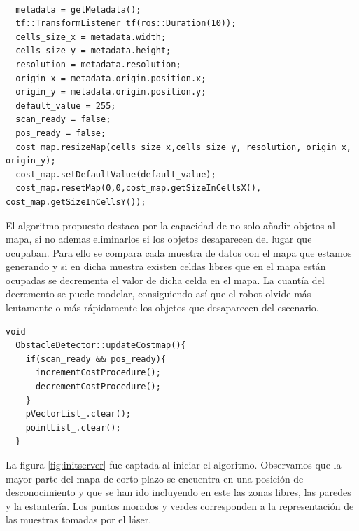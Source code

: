 \renewcommand{\lstlistingname}{Código}
\begin{lstlisting}[caption=Inicialización del cost\_map correspondiente al mapa de corto plazo, label={lst:initcostmap}]

  metadata = getMetadata();
  tf::TransformListener tf(ros::Duration(10));
  cells_size_x = metadata.width;
  cells_size_y = metadata.height;
  resolution = metadata.resolution;
  origin_x = metadata.origin.position.x;
  origin_y = metadata.origin.position.y;
  default_value = 255;
  scan_ready = false;
  pos_ready = false;
  cost_map.resizeMap(cells_size_x,cells_size_y, resolution, origin_x, origin_y);
  cost_map.setDefaultValue(default_value);
  cost_map.resetMap(0,0,cost_map.getSizeInCellsX(), cost_map.getSizeInCellsY());
\end{lstlisting}


El algoritmo propuesto destaca por la capacidad de no solo añadir objetos al mapa, si no ademas eliminarlos si los objetos desaparecen del lugar que ocupaban. Para ello se compara cada muestra de datos con el mapa que estamos generando y si en dicha muestra existen celdas libres que en el mapa están ocupadas se decrementa el valor de dicha celda en el mapa. La cuantía del decremento se puede modelar, consiguiendo así que el robot olvide más lentamente o más rápidamente los objetos que desaparecen del escenario.\\

\renewcommand{\lstlistingname}{Código}
\begin{lstlisting}[caption=Función que actualiza el mapa en cada iteración, label={lst:updatecostmap}]
  void
  ObstacleDetector::updateCostmap(){
    if(scan_ready && pos_ready){
      incrementCostProcedure();
      decrementCostProcedure();
    }
    pVectorList_.clear();
    pointList_.clear();
  }
\end{lstlisting}

La figura \ref{fig:initserver} fue captada al iniciar el algoritmo. Observamos que la mayor parte del mapa de corto plazo se encuentra en una posición de desconocimiento y que se han ido incluyendo en este las zonas libres, las paredes y la estantería. Los puntos morados y verdes corresponden a la representación de las muestras tomadas por el láser.

